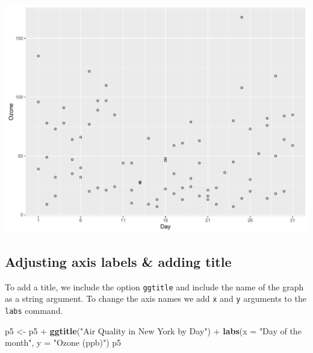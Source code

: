 \documentclass[]{article}
\newenvironment{Shaded}{\begin{snugshade}}{\end{snugshade}}
\newcommand{\KeywordTok}[1]{\textcolor[rgb]{0.13,0.29,0.53}{\textbf{{#1}}}}
\newcommand{\DataTypeTok}[1]{\textcolor[rgb]{0.13,0.29,0.53}{{#1}}}
\newcommand{\StringTok}[1]{\textcolor[rgb]{0.31,0.60,0.02}{{#1}}}
\newcommand{\NormalTok}[1]{{#1}}
\begin{document}
\begin{center}\includegraphics{0_all_posts_pdf/scatter_3-1} \end{center}

\subsection{Adjusting axis labels \& adding
title}\label{adjusting-axis-labels-adding-title-3}

To add a title, we include the option \texttt{ggtitle} and include the
name of the graph as a string argument. To change the axis names we add
\texttt{x} and \texttt{y} arguments to the \texttt{labs} command.

\begin{Shaded}
\begin{Highlighting}[]
\NormalTok{p5 <-}\StringTok{ }\NormalTok{p5 +}\StringTok{ }\KeywordTok{ggtitle}\NormalTok{(}\StringTok{"Air Quality in New York by Day"}\NormalTok{) +}\StringTok{ }
\StringTok{      }\KeywordTok{labs}\NormalTok{(}\DataTypeTok{x =} \StringTok{"Day of the month"}\NormalTok{, }\DataTypeTok{y =} \StringTok{"Ozone (ppb)"}\NormalTok{) }
\NormalTok{p5}
\end{Highlighting}
\end{Shaded}
\end{document}
